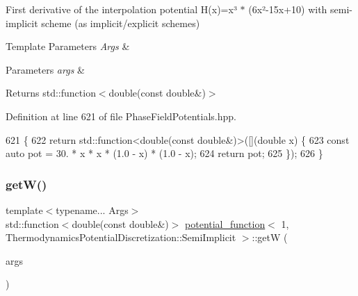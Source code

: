 First derivative of the interpolation potential H(x)=x³ $\ast$ (6x²-\/15x+10) with semi-\/implicit scheme (as implicit/explicit schemes) 


\begin{DoxyTemplParams}{Template Parameters}
{\em Args} & \\
\hline
\end{DoxyTemplParams}

\begin{DoxyParams}{Parameters}
{\em args} & \\
\hline
\end{DoxyParams}
\begin{DoxyReturn}{Returns}
std\+::function$<$double(const double\&)$>$ 
\end{DoxyReturn}


Definition at line 621 of file Phase\+Field\+Potentials.\+hpp.


\begin{DoxyCode}
621                                                         \{
622     \textcolor{keywordflow}{return} std::function<double(const double&)>([](\textcolor{keywordtype}{double} x) \{
623       \textcolor{keyword}{const} \textcolor{keyword}{auto} pot = 30. * x * x * (1.0 - x) * (1.0 - x);
624       \textcolor{keywordflow}{return} pot;
625     \});
626   \}
\end{DoxyCode}
\mbox{\label{structpotential__function_3_011_00_01ThermodynamicsPotentialDiscretization_1_1SemiImplicit_01_4_af7269239087bb065b4133b36fcbd6da6}} 
\subsubsection{\texorpdfstring{get\+W()}{getW()}}
{\footnotesize\ttfamily template$<$typename... Args$>$ \\
std\+::function$<$double(const double\&)$>$ \hyperlink{structpotential__function}{potential\+\_\+function}$<$ 1, Thermodynamics\+Potential\+Discretization\+::\+Semi\+Implicit $>$\+::getW (\begin{DoxyParamCaption}\item[{Args...}]{args }\end{DoxyParamCaption})\hspace{0.3cm}{\ttfamily [inline]}}



